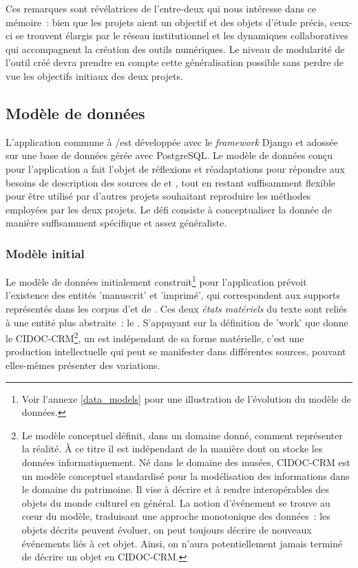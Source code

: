 Ces remarques sont révélatrices de l'entre-deux qui nous intéresse dans
ce mémoire~: bien que les projets aient un objectif et des objets
d'étude précis, ceux-ci se trouvent élargis par le réseau institutionnel
et les dynamiques collaboratives qui accompagnent la création des outils
numériques. Le niveau de modularité de l'outil créé devra prendre en
compte cette généralisation possible sans perdre de vue les objectifs
initiaux des deux projets.

\hypertarget{modele-de-donnees}{%
\subsection{Modèle de données}\label{modele-de-donnees}}

L'application commune à \vhs/\eida est développée avec le \textit{framework} Django
et adossée sur une base de données gérée avec PostgreSQL. Le modèle de
données conçu pour l'application a fait l'objet de réflexions et
réadaptations pour répondre aux besoins de description des sources de
\vhs et \eida, tout en restant suffisamment flexible pour être utilisé par
d'autres projets souhaitant reproduire les méthodes employées par les
deux projets. Le défi consiste à conceptualiser la donnée de manière
suffisamment spécifique et assez généraliste.

\hypertarget{modele-initial}{%
\subsubsection{Modèle initial}\label{modele-initial}}

Le modèle de données initialement construit\footnote{Voir l'annexe \ref{data_models} pour une illustration de l'évolution du modèle de données.} pour
l'application \vhs prévoit l'existence des entités 'manuscrit' et
'imprimé', qui correspondent aux supports représentés dans
les corpus d'\eida et de \vhs. Ces deux \emph{états matériels} du texte
sont reliés à une entité plus abstraite~: le \wo.
S'appuyant sur la définition de 'work' que donne le CIDOC-CRM\footnote{Le
  modèle conceptuel définit, dans un domaine donné, comment représenter
  la réalité. À ce titre il est indépendant de la manière dont on stocke
  les données informatiquement. Né dans le domaine des musées, CIDOC-CRM
  est un modèle conceptuel standardisé pour la modélisation des
  informations dans le domaine du patrimoine. Il vise à décrire et à
  rendre interopérables des objets du monde culturel en général. La
  notion d'événement se trouve au cœur du modèle, traduisant une
  approche monotonique des données~: les objets décrits peuvent évoluer,
  on peut toujours décrire de nouveaux événements liés à cet objet.
  Ainsi, on n'aura potentiellement jamais terminé de décrire un objet en
  CIDOC-CRM.}, un \wo est indépendant de sa forme matérielle, c'est une
production intellectuelle qui peut se manifester dans différentes
sources, pouvant elles-mêmes présenter des variations.

